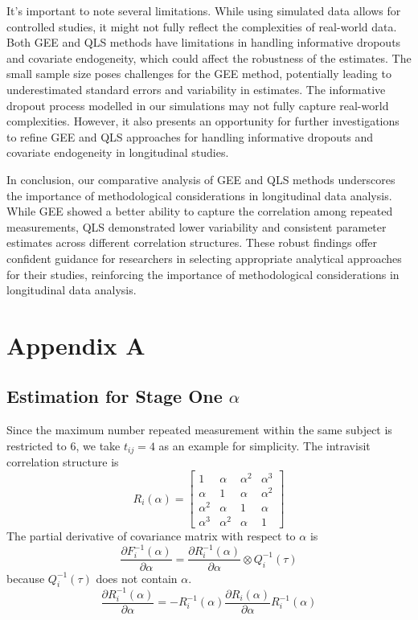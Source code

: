 \documentclass[
]{aft}
\begin{document}
It's important to note several limitations. While using simulated data
allows for controlled studies, it might not fully reflect the
complexities of real-world data. Both GEE and QLS methods have
limitations in handling informative dropouts and covariate endogeneity,
which could affect the robustness of the estimates. The small sample
size poses challenges for the GEE method, potentially leading to
underestimated standard errors and variability in estimates. The
informative dropout process modelled in our simulations may not fully
capture real-world complexities. However, it also presents an
opportunity for further investigations to refine GEE and QLS approaches
for handling informative dropouts and covariate endogeneity in
longitudinal studies.

In conclusion, our comparative analysis of GEE and QLS methods
underscores the importance of methodological considerations in
longitudinal data analysis. While GEE showed a better ability to capture
the correlation among repeated measurements, QLS demonstrated lower
variability and consistent parameter estimates across different
correlation structures. These robust findings offer confident guidance
for researchers in selecting appropriate analytical approaches for their
studies, reinforcing the importance of methodological considerations in
longitudinal data analysis.

\newpage

\section{Appendix A}\label{appendix-a}

\subsection{\texorpdfstring{Estimation for Stage One
\(\alpha\)}{Estimation for Stage One \textbackslash alpha}}\label{estimation-for-stage-one-alpha}

Since the maximum number repeated measurement within the same subject is
restricted to 6, we take \(t_{ij} = 4\) as an example for simplicity.
The intravisit correlation structure is \[
R_i(\alpha) = 
\begin{bmatrix}
1 & \alpha & \alpha^2 & \alpha^3\\
\alpha & 1 & \alpha & \alpha^2\\
\alpha^2 & \alpha & 1 & \alpha\\
\alpha^3 & \alpha^2 & \alpha & 1
\end{bmatrix}
\] The partial derivative of covariance matrix with respect to
\(\alpha\) is \[
\frac{\partial F_i^{-1}(\alpha)}{\partial \alpha} = \frac{\partial{R_i^{-1}(\alpha)}}{\partial \alpha} \otimes Q_i^{-1}(\tau)
\] because \(Q^{-1}_i(\tau)\) does not contain \(\alpha\). \[
\frac{\partial{R_i^{-1}(\alpha)}}{\partial \alpha} = -R_i^{-1}(\alpha) \frac{\partial R_i(\alpha)}{\partial \alpha} R_i^{-1}(\alpha)
\]
\end{document}
